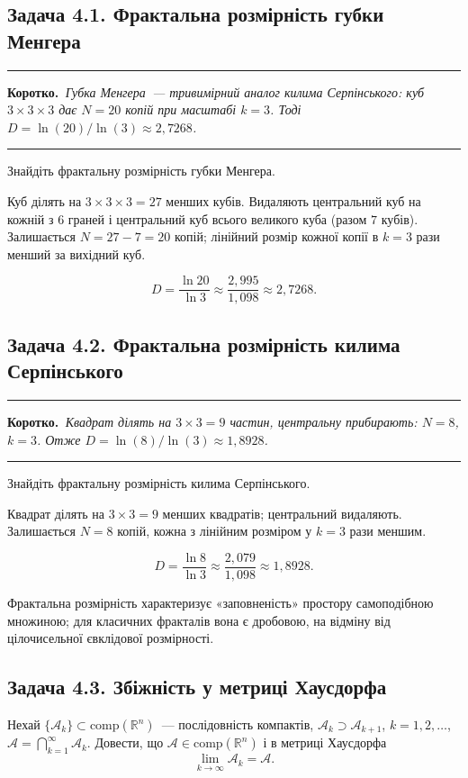\documentclass[12pt,a4paper]{article}
\newenvironment{korotko}
  {\par\medskip\noindent\begingroup\color{accent!75!black}\rule{\linewidth}{0.4pt}\par
   \noindent\textbf{Коротко.}\itshape\,}
  {\par\noindent\rule{\linewidth}{0.4pt}\endgroup\medskip}
\begin{document}
\subsection{Задача 4.1. Фрактальна розмірність губки Менгера}

\begin{korotko}
Губка Менгера~--- тривимірний аналог килима Серпінського: куб $3\times3\times3$
дає $N=20$ копій при масштабі $k=3$. Тоді
$D=\ln(20)/\ln(3)\approx 2{,}7268$.
\end{korotko}

Знайдіть фрактальну розмірність губки Менгера.

Куб ділять на $3\times3\times3=27$ менших кубів. Видаляють центральний куб на
кожній з $6$ граней і центральний куб всього великого куба (разом $7$ кубів).
Залишається $N=27-7=20$ копій; лінійний розмір кожної копії в $k=3$ рази
менший за вихідний куб.

\begin{equation*}
  D=\frac{\ln 20}{\ln 3}\approx\frac{2{,}995}{1{,}098}\approx 2{,}7268.
\end{equation*}

\subsection{Задача 4.2. Фрактальна розмірність килима Серпінського}

\begin{korotko}
Квадрат ділять на $3\times3=9$ частин, центральну прибирають: $N=8$, $k=3$.
Отже $D=\ln(8)/\ln(3)\approx 1{,}8928$.
\end{korotko}

Знайдіть фрактальну розмірність килима Серпінського.

Квадрат ділять на $3\times3=9$ менших квадратів; центральний видаляють.
Залишається $N=8$ копій, кожна з лінійним розміром у $k=3$ рази меншим.

\begin{equation*}
  D=\frac{\ln 8}{\ln 3}\approx\frac{2{,}079}{1{,}098}\approx 1{,}8928.
\end{equation*}

Фрактальна розмірність характеризує «заповненість» простору самоподібною
множиною; для класичних фракталів вона є дробовою, на відміну від цілочисельної
євклідової розмірності.

\subsection{Задача 4.3. Збіжність у метриці Хаусдорфа}
Нехай $\{\mathcal{A}_k\}\subset\mathrm{comp}(\mathbb{R}^n)$~--- послідовність компактів,
$\mathcal{A}_k\supset\mathcal{A}_{k+1}$, $k=1,2,\ldots$,
$\mathcal{A}=\bigcap_{k=1}^{\infty}\mathcal{A}_k$. Довести, що
$\mathcal{A}\in\mathrm{comp}(\mathbb{R}^n)$ і в метриці Хаусдорфа
\begin{equation*}
  \lim_{k\to\infty}\mathcal{A}_k=\mathcal{A}.
\end{equation*}
\end{document}
